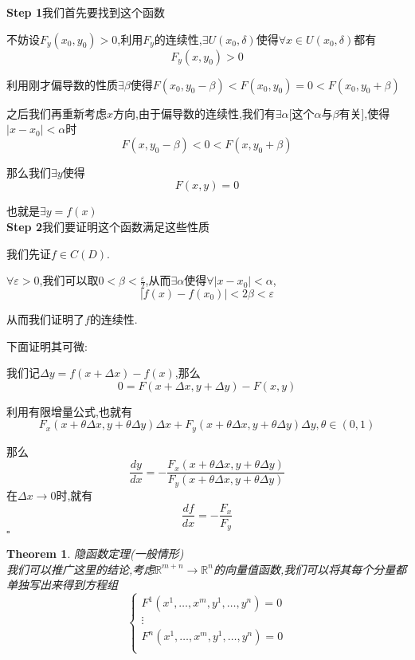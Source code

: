 \documentclass[11pt,hyperref,a4paper,UTF8]{ctexart}
\newtheorem{theorem}{Theorem}[subsection]
\newenvironment{cproof}{%
\heiti{证明}\kaishu
}{%
  \hfill $\square$
  \par\bigskip
}
\newcommand{\RR}{\mathbb{R}}
\begin{document}
\begin{CJK}{UTF8}{gkai}
\begin{cproof}
  \textbf{Step 1}我们首先要找到这个函数

  不妨设$F_y(x_0,y_0) > 0$,利用$F_y$的连续性,$\exists U(x_0,\delta)$使得$\forall x \in U(x_0,\delta)$都有
  \[F_y(x,y_0) > 0\]

  利用刚才偏导数的性质$\exists \beta$使得$F(x_0,y_0 - \beta) < F(x_0,y_0) = 0 < F(x_0,y_0 + \beta)$

  之后我们再重新考虑$x$方向,由于偏导数的连续性,我们有$\exists \alpha$[这个$\alpha$与$\beta$有关],使得$|x - x_0| < \alpha$时 
  \[F(x,y_0 - \beta) < 0 < F(x,y_0 + \beta) \]

  那么我们$\exists y$使得
  \[F(x,y) = 0\]

  也就是$\exists y = f(x)$\\

  \textbf{Step 2}我们要证明这个函数满足这些性质

  我们先证$f \in C(D)$.
  
  $\forall \varepsilon > 0$,我们可以取$0 < \beta < \frac{\varepsilon}{2}$,从而$\exists \alpha$使得$\forall |x - x_0| < \alpha$,
  \[|f(x) - f(x_0)| < 2\beta < \varepsilon  \]

  从而我们证明了$f$的连续性.

  下面证明其可微:

  我们记$\Delta y = f(x + \Delta x) - f(x)$,那么
  \[0 = F(x + \Delta x,y + \Delta y) - F(x,y)\]

  利用有限增量公式,也就有
  \[F_x(x + \theta \Delta x , y + \theta \Delta y) \Delta x + F_y(x + \theta \Delta x , y + \theta \Delta y) \Delta y,\theta \in (0,1)\]

  那么
  \[\frac{dy}{dx} = - \frac{F_x(x + \theta \Delta x , y + \theta \Delta y)}{F_y(x + \theta \Delta x , y + \theta \Delta y)}\]
  在$\Delta x \to 0$时,就有
  \[\frac{df}{dx} = -\frac{F_x}{F_y}\]
\end{cproof}

\begin{theorem}
隐函数定理(一般情形)\\

我们可以推广这里的结论,考虑$\RR^{m + n} \to \RR^n$的向量值函数,我们可以将其每个分量都单独写出来得到方程组
\[
\begin{cases}
  F^1(x^1,\ldots,x^m,y^1,\ldots,y^n) = 0\\
  \vdots\\
  F^n(x^1,\ldots,x^m,y^1,\ldots,y^n) = 0\\
\end{cases}  
\]


\end{theorem}
\end{CJK}
\end{document}
